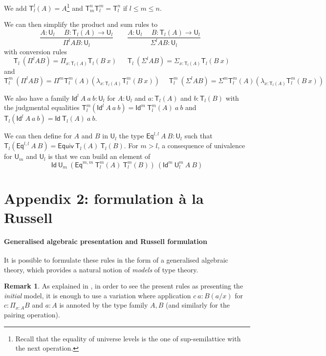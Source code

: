 \documentclass[11pt,a4paper]{article}
\theoremstyle{definition}
\newtheorem{remark}{Remark}
\newcommand{\Id}{\mathsf{Id}}
\newcommand{\Eq}{\mathsf{Eq}}
\newcommand{\UU}{\mathsf{U}}
\newcommand{\mylam}[3]{\lambda_{#1:#2}#3}
\newcommand{\mypi}[3]{\Pi_{#1:#2}#3}
\newcommand{\mysig}[3]{\Sigma_{#1:#2}#3}
\newcommand{\T}{\mathsf{T}}
\newcommand{\Equiv}{\mathsf{Equiv}}
\begin{document}
We add $\T_{l}^l(A) = A$\footnote{Recall that the equality of universe levels is the one of
  sup-semilattice with the next operation.}
and $\T_{m}^n\T_{l}^m = \T_l^n$ if $l\leqslant m\leqslant n$.

We can then simplify the product and sum rules to
$$
\frac{A:\UU_{l}~~~~~~B:\T_{l}(A)\rightarrow \UU_{l}}
     {\Pi^{l} A B:\UU_{l}}~~~~~~~~~
\frac{A:\UU_{l}~~~~~~B:\T_{l}(A)\rightarrow \UU_{l}}
     {\Sigma^{l} A B:\UU_{l}}~~~~~~~~~
$$
with conversion rules
$$
\T_{l}~(\Pi^{l} A B) = \mypi{x}{\T_{l}(A)}{ \T_{l}(B~x)}~~~~~~~
\T_{l}~(\Sigma^{l} A B) =  \mysig{x}{\T_{l}(A)}{ \T_{l}(B~x)}~~~~~~~
$$
and
$$
\T_{l}^{m}~(\Pi^{l} A B) = \Pi^{m} \T_{l}^{m}(A) (\mylam {x}{\T_{l}(A)}{\T_{l}^{m}(B~x)})~~~~~~
\T_{l}^{m}~(\Sigma^{l} A B) = \Sigma^{m} \T_{l}^{m}(A) (\mylam {x}{\T_{l}(A)}{\T_{l}^{m}(B~x)})~~~~~~
$$

We also have a family $\Id^l~A~a~b:\UU_l$ for $A:\UU_l$ and $a:\T_l(A)$ and $b:\T_l(B)$
with the judgmental equalities $\T_l^m(\Id^l~A~a~b) = \Id^m~\T_l^m(A)~a~b$
and $\T_l(\Id^l~A~a~b) = \Id~\T_l(A)~a~b$.

\medskip

We can then define for $A$ and $B$ in $\UU_l$
the type $\Eq^{l,l}~A~B:\UU_l$ such that
$\T_l(\Eq^{l,l}~A~B) = \Equiv~\T_l(A)~\T_l(B)$. For $m>l$, a consequence of univalence
for $\UU_m$ and $\UU_l$ is that we can build an element of
$$
\Id~\UU_m~(\Eq^{m,m}~\T^m_l(A)~\T^m_l(B))~(\Id^m~\UU^m_l~A~B)
$$

\section*{Appendix 2: formulation \`a la Russell}

\paragraph{Generalised algebraic presentation and Russell formulation}

It is possible to formulate these rules in the form of a generalised algebraic theory, which provides
a natural notion of {\em models} of type theory.

\begin{remark} \label{app:annotation}
As explained
in \cite{streicher:semtt}, in order to see the present rules as presenting the {\em initial} model,
it is enough to use a variation where application $c~a:B(a/x)$ for $c:\mypi{x}{A}B$ and $a:A$
is annoted by the type family $A,B$ (and similarly for the pairing operation).
\end{remark}
\end{document}
